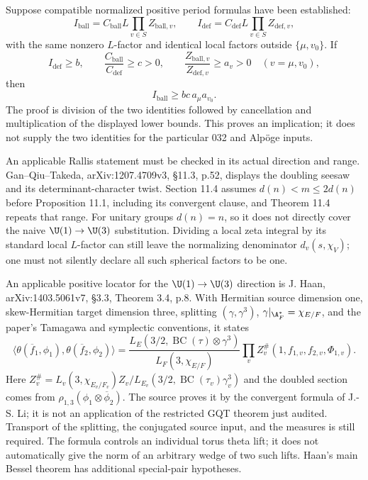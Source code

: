 \documentclass[11pt]{article}
\theoremstyle{definition}\newtheorem{definition}[theorem]{Definition}\newtheorem{remark}[theorem]{Remark}
\begin{document}
Suppose compatible normalized positive period formulas have been established:
\[
 I_{\mathrm{ball}}=C_{\mathrm{ball}}L\prod_{v\in S}Z_{\mathrm{ball},v},
 \qquad
 I_{\mathrm{def}}=C_{\mathrm{def}}L\prod_{v\in S}Z_{\mathrm{def},v},
\]
with the same nonzero $L$-factor and identical local factors outside
$\{\mu,v_0\}$. If
\[
 I_{\mathrm{def}}\geq b,\qquad
 \frac{C_{\mathrm{ball}}}{C_{\mathrm{def}}}\geq c>0,
 \qquad \frac{Z_{\mathrm{ball},v}}{Z_{\mathrm{def},v}}\geq a_v>0
 \quad(v=\mu,v_0),
\]
then
\[
 I_{\mathrm{ball}}\geq bc\,a_\mu a_{v_0}.
\]
The proof is division of the two identities followed by cancellation and multiplication of the displayed lower bounds. This proves an implication; it does not supply the two identities for the particular 032 and Alp\"oge inputs.

An applicable Rallis statement must be checked in its actual direction and range. Gan--Qiu--Takeda, arXiv:1207.4709v3, \S11.3, p.52, displays the doubling seesaw and its determinant-character twist. Section 11.4 assumes $d(n)<m\leq2d(n)$ before Proposition 11.1, including its convergent clause, and Theorem 11.4 repeats that range. For unitary groups $d(n)=n$, so it does not directly cover the naive $\U(1)\to\U(3)$ substitution. Dividing a local zeta integral by its standard local $L$-factor can still leave the normalizing denominator $d_v(s,\chi_V)$; one must not silently declare all such spherical factors to be one.

An applicable positive locator for the $\U(1)\to\U(3)$ direction is J. Haan, arXiv:1403.5061v7, \S3.3, Theorem 3.4, p.8. With Hermitian source dimension one, skew-Hermitian target dimension three, splitting $(\gamma,\gamma^3)$, $\gamma|_{\A_F^*}=\chi_{E/F}$, and the paper's Tamagawa and symplectic conventions, it states
\[
 \langle\theta(\overline f_1,\phi_1),\theta(\overline f_2,\phi_2)\rangle
 =\frac{L_E(3/2,\operatorname{BC}(\tau)\otimes\gamma^3)}
        {L_F(3,\chi_{E/F})}
   \prod_v Z_v^{\#}(1,f_{1,v},f_{2,v},\Phi_{1,v}).
\]
Here $Z_v^{\#}=L_v(3,\chi_{E_v/F_v})Z_v/L_{E_v}(3/2,\operatorname{BC}(\tau_v)\gamma_v^3)$ and the doubled section comes from $\rho_{1,3}(\phi_1\otimes\overline\phi_2)$. The source proves it by the convergent formula of J.-S. Li; it is not an application of the restricted GQT theorem just audited. Transport of the splitting, the conjugated source input, and the measures is still required. The formula controls an individual torus theta lift; it does not automatically give the norm of an arbitrary wedge of two such lifts. Haan's main Bessel theorem has additional special-pair hypotheses.
\end{document}
